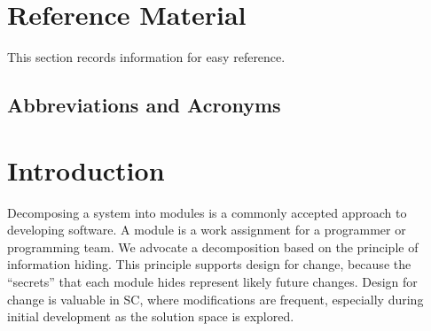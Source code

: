 \documentclass[12pt, titlepage]{article}
\begin{document}
\newpage

\section{Reference Material}

This section records information for easy reference.

\subsection{Abbreviations and Acronyms}

\renewcommand{\arraystretch}{1.2}

\newpage

\tableofcontents

\listoftables

\listoffigures

\newpage


\section{Introduction}

Decomposing a system into modules is a commonly accepted approach to developing
software.  A module is a work assignment for a programmer or programming
team.  We advocate a decomposition
based on the principle of information hiding.  This
principle supports design for change, because the ``secrets'' that each module
hides represent likely future changes.  Design for change is valuable in SC,
where modifications are frequent, especially during initial development as the
solution space is explored.  
\end{document}

